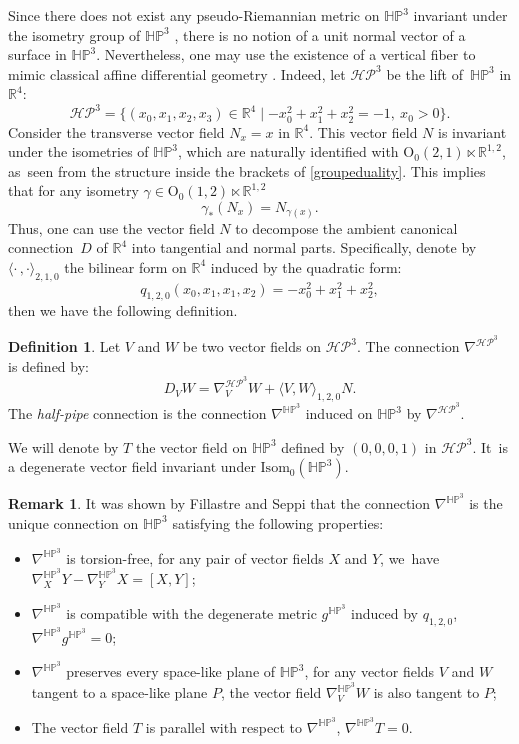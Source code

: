 \documentclass[10pt]{amsart}
\theoremstyle{plain}
\theoremstyle{definition}
\newtheorem{defi}[cor]{Definition}
\newtheorem{remark}[cor]{Remark}
\newcommand{\minko}{\mathbb{R}^{1,2}}
\newcommand{\HP}{\mathbb{HP}^3}
\newcommand{\isom}{\mathrm{Isom}_0}
\newcommand{\inner}[1] {\langle #1 \rangle}
\begin{document}
Since there does not exist any pseudo-Riemannian metric on $\HP$ invariant under the isometry group of $\HP$ \cite[Fact 3.11]{fillastreseppi}, there is no notion of a unit normal vector of a surface in $\HP$. Nevertheless, one may use the existence of a vertical fiber to mimic classical affine differential geometry \cite{affine_diff_geometry}. Indeed, let $\mathcal{HP}^3$ be the lift of~$\HP$ in $\mathbb{R}^4$:
\[
\mathcal{HP}^3=\{(x_0,x_1,x_2,x_3)\in\mathbb{R}^4\mid -x_0^2+x_1^2+x_2^2=-1, \ x_0>0 \}.
\]
Consider the transverse vector field $N_x=x$ in $\mathbb{R}^4$. This vector field $N$ is invariant under the isometries of $\HP$, which are naturally identified with $\mathrm{O}_{0}(2,1)\ltimes\minko$, as~seen from the structure inside the brackets of \eqref{groupeduality}. This implies that for any isometry $\gamma\in\mathrm{O}_{0}(1,2)\ltimes\minko$
\[
\gamma_{*}(N_x) = N_{\gamma(x)}.
\]
Thus, one can use the vector field $N$ to decompose the ambient canonical connection~$D$ of $\mathbb{R}^4$ into tangential and normal parts. Specifically, denote by $\inner{\cdot\,,\cdot}_{2,1,0}$ the bilinear form on $\mathbb{R}^4$ induced by the quadratic form:
\[
q_{1,2,0}(x_0,x_1,x_1,x_2)=-x_0^2+x_1^2+x_2^2,
\]
then we have the following definition.

\begin{defi} Let $V$ and $W$ be two vector fields on $\mathcal{HP}^3$. The connection
$\nabla^{\mathcal{HP}^3}$ is defined by:
\[
D_VW=\nabla^{\mathcal{HP}^3}_VW+\inner{V,W}_{1,2,0}N.
\]
The \emph{half-pipe} connection is the connection $\nabla^{\HP}$
induced on $\HP$ by $\nabla^{\mathcal{HP}^3}$.
\end{defi}
We will denote by $T$ the vector field on $\HP$ defined by $(0, 0, 0, 1)$ in $\mathcal{HP}^3$. It~is a degenerate vector field invariant under $\isom(\HP)$.
\begin{remark}
It was shown by Fillastre and Seppi \cite[Props.\, 5.3 \& 5.11]{fillastreseppi} that the connection $\nabla^{\HP}$ is the unique connection on $\HP$ satisfying the following properties:
\begin{itemize}
\item $\nabla^{\HP}$ is torsion-free, \ie for any pair of vector fields $X$ and $Y$, we~have $\nabla^{\HP}_X Y - \nabla^{\HP}_Y X = [X, Y]$;
\item $\nabla^{\HP}$ is compatible with the degenerate metric $g^{\HP}$ induced by $q_{1,2,0}$, \ie $\nabla^{\HP} g^{\HP} = 0$;
\item $\nabla^{\HP}$ preserves every space-like plane of $\HP$, \ie for any vector fields $V$ and $W$ tangent to a space-like plane $P$, the vector field $\nabla^{\HP}_V W$ is also tangent to $P$;
\item The vector field $T$ is parallel with respect to $\nabla^{\HP}$, \ie $\nabla^{\HP} T = 0$.
\end{itemize}
\end{remark}
\end{document}
